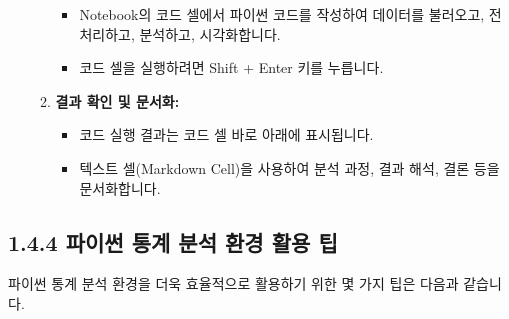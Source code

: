 \documentclass[
  letterpaper,
]{book}
\providecommand{\tightlist}{%
  \setlength{\itemsep}{0pt}\setlength{\parskip}{0pt}}
\begin{document}
\begin{itemize}
\begin{enumerate}
    \begin{itemize}
    \tightlist
    \item
      Notebook의 코드 셀에서 파이썬 코드를 작성하여 데이터를 불러오고,
      전처리하고, 분석하고, 시각화합니다.
    \item
      코드 셀을 실행하려면 Shift + Enter 키를 누릅니다.
    \end{itemize}
  \item
    \textbf{결과 확인 및 문서화:}

    \begin{itemize}
    \tightlist
    \item
      코드 실행 결과는 코드 셀 바로 아래에 표시됩니다.
    \item
      텍스트 셀(Markdown Cell)을 사용하여 분석 과정, 결과 해석, 결론
      등을 문서화합니다.
    \end{itemize}
  \end{enumerate}
\end{itemize}

\subsection{1.4.4 파이썬 통계 분석 환경 활용
팁}\label{uxd30cuxc774uxc36c-uxd1b5uxacc4-uxbd84uxc11d-uxd658uxacbd-uxd65cuxc6a9-uxd301}

파이썬 통계 분석 환경을 더욱 효율적으로 활용하기 위한 몇 가지 팁은
다음과 같습니다.
\end{document}
